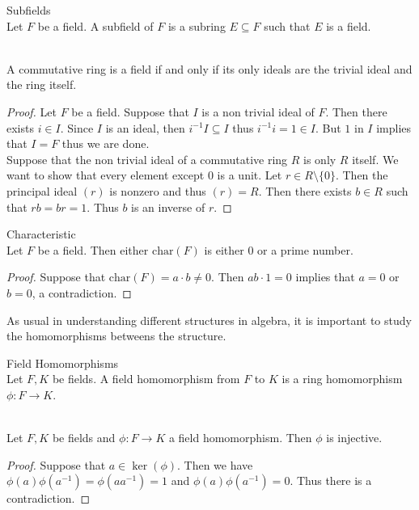 \documentclass[a4paper]{article}
\begin{document}
\begin{defn}{Subfields}{}\\
Let $F$ be a field. A subfield of $F$ is a subring $E\subseteq F$ such that $E$ is a field. 
\end{defn}

\begin{prp}{}{}\\
A commutative ring is a field if and only if its only ideals are the trivial ideal and the ring itself. 
\begin{proof}
Let $F$ be a field. Suppose that $I$ is a non trivial ideal of $F$. Then there exists $i\in I$. Since $I$ is an ideal, then $i^{-1}I\subseteq I$ thus $i^{-1}i=1\in I$. But $1$ in $I$ implies that $I=F$ thus we are done. \\
Suppose that the non trivial ideal of a commutative ring $R$ is only $R$ itself. We want to show that every element except $0$ is a unit. Let $r\in R\setminus\{0\}$. Then the principal ideal $(r)$ is nonzero and thus $(r)=R$. Then there exists $b\in R$ such that $rb=br=1$. Thus $b$ is an inverse of $r$. 
\end{proof}
\end{prp}

\begin{prp}{Characteristic}{}\\
Let $F$ be a field. Then either $\text{char}(F)$ is either $0$ or a prime number. 
\begin{proof}
Suppose that $\text{char}(F)=a\cdot b\neq 0$. Then $ab\cdot 1=0$ implies that $a=0$ or $b=0$, a contradiction. 
\end{proof}
\end{prp}

As usual in understanding different structures in algebra, it is important to study the homomorphisms betweens the structure. 

\begin{defn}{Field Homomorphisms}{}\\
Let $F,K$ be fields. A field homomorphism from $F$ to $K$ is a ring homomorphism $\phi:F\to K$. 
\end{defn}

\begin{lmm}{}{}\\
Let $F,K$ be fields and $\phi:F\to K$ a field homomorphism. Then $\phi$ is injective. 
\begin{proof}
Suppose that $a\in\ker(\phi)$. Then we have $\phi(a)\phi(a^{-1})=\phi(aa^{-1})=1$ and $\phi(a)\phi(a^{-1})=0$. Thus there is a contradiction. 
\end{proof}
\end{lmm}
\end{document}
